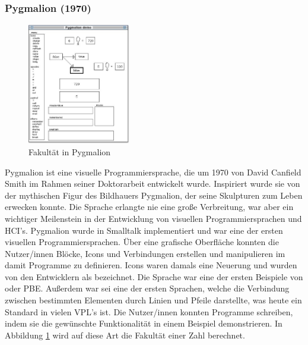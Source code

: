 \documentclass[ngerman]{article}
\begin{document}
\subsubsection{Pygmalion (1970)}
\begingroup
\setlength\intextsep{2pt}
\begin{minipage}{\linewidth}
\begin{figure}
  \centering
  \includegraphics[width=0.4\textwidth]{./graphics/pygmalion.jpg}
  \caption{Fakultät in Pygmalion \cite{smith1975pygmalion}}
  \label{fig:pygmalion_demo}
\end{figure}

Pygmalion ist eine visuelle Programmiersprache, die um 1970 von David Canfield Smith im Rahmen seiner Doktorarbeit entwickelt wurde. Inspiriert wurde sie von der mythischen Figur des Bildhauers Pygmalion, der seine Skulpturen zum Leben erwecken konnte.
Die Sprache erlangte nie eine große Verbreitung, war aber ein wichtiger Meilenstein in der Entwicklung von visuellen Programmiersprachen und HCI's.
Pygmalion wurde in Smalltalk implementiert und war eine der ersten visuellen Programmiersprachen. Über eine grafische Oberfläche konnten die Nutzer/innen Blöcke, Icons und Verbindungen erstellen und manipulieren im damit Programme zu definieren.
  Icons waren damals eine Neuerung und wurden von den Entwicklern als  bezeichnet. 
  Die Sprache war eine der ersten Beispiele von  oder PBE. Außerdem war sei eine der ersten Sprachen, welche die Verbindung zwischen bestimmten Elementen durch Linien und Pfeile darstellte, was heute ein Standard in vielen VPL's ist.
Die Nutzer/innen konnten Programme schreiben, indem sie die gewünschte Funktionalität in einem Beispiel demonstrieren. 
In Abbildung \ref{fig:pygmalion_demo} wird auf diese Art die Fakultät einer Zahl berechnet. 

\end{minipage}
\endgroup
\end{document}
